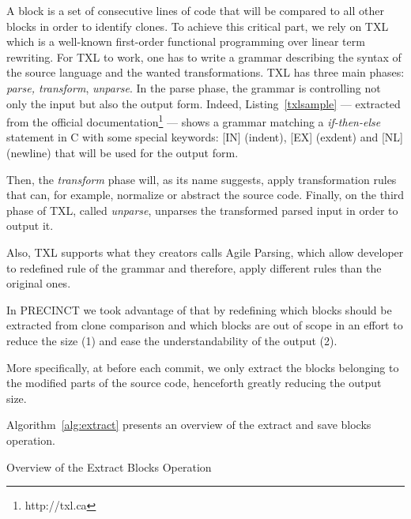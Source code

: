 \documentclass[conference]{IEEEtran}
\begin{document}
A block is a set of consecutive lines of code that will be compared to all other blocks in order to identify clones.
To achieve this critical part, we rely on TXL\cite{Cordy2006a} which is a well-known first-order functional programming over linear term rewriting.
For TXL to work, one has to write a grammar describing the syntax of the source  language and the wanted transformations.
TXL has three main phases: \textit{parse, transform}, \textit{unparse}.
In the parse phase, the grammar is controlling not only the input but also the output form. Indeed, Listing~\ref{txlsample} --- extracted from the official documentation\footnote{http://txl.ca} --- shows a grammar matching a \textit{if-then-else} statement in C with some special keywords: [IN] (indent), [EX] (exdent) and [NL] (newline) that will be used for the output form.

\noindent\begin{minipage}{0.90\linewidth}

  

\end{minipage}

Then, the \textit{transform} phase will, as its name suggests, apply transformation rules that can, for example, normalize or abstract the source code.
Finally, on the third phase of TXL,  called \textit{unparse}, unparses the transformed parsed input in order to output it.

Also, TXL supports what they creators calls Agile Parsing\cite{Dean}, which allow developer to redefined rule of the grammar and therefore, apply different rules than the original ones.

In PRECINCT we took advantage of that by redefining which blocks should be extracted from clone comparison and which blocks are out of scope in an effort to reduce the size (1) and ease the understandability of the output (2).

More specifically, at before each commit, we only extract the blocks belonging to the modified parts of the source code, henceforth greatly reducing the output size.

Algorithm~\ref{alg:extract} presents an overview of the extract and save blocks operation.

\begin{algorithm}[H]
 \caption{Overview of the Extract Blocks Operation\label{alg:extract}}
\end{algorithm}
\end{document}
